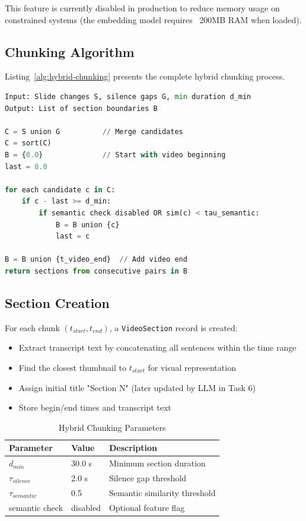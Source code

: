 \documentclass[12pt,a4paper]{article}
\begin{document}
This feature is currently disabled in production to reduce memory usage on constrained systems (the embedding model requires ~200MB RAM when loaded).

\subsection{Chunking Algorithm}

Listing~\ref{alg:hybrid-chunking} presents the complete hybrid chunking process.

\begin{lstlisting}[language=Python, caption={Hybrid Video Chunking}, label={alg:hybrid-chunking}]
Input: Slide changes S, silence gaps G, min duration d_min
Output: List of section boundaries B

C = S union G          // Merge candidates
C = sort(C)
B = {0.0}              // Start with video beginning
last = 0.0

for each candidate c in C:
    if c - last >= d_min:
        if semantic check disabled OR sim(c) < tau_semantic:
            B = B union {c}
            last = c

B = B union {t_video_end}  // Add video end
return sections from consecutive pairs in B
\end{lstlisting}

\subsection{Section Creation}

For each chunk $(t_{start}, t_{end})$, a \texttt{VideoSection} record is created:

\begin{itemize}
    \item Extract transcript text by concatenating all sentences within the time range
    \item Find the closest thumbnail to $t_{start}$ for visual representation
    \item Assign initial title "Section N" (later updated by LLM in Task 6)
    \item Store begin/end times and transcript text
\end{itemize}

\begin{table}[H]
    \centering
    \caption{Hybrid Chunking Parameters}
    \begin{tabular}{@{}lll@{}}
        \toprule
        \textbf{Parameter} & \textbf{Value} & \textbf{Description} \\ \midrule
        $d_{min}$ & 30.0 s & Minimum section duration \\
        $\tau_{silence}$ & 2.0 s & Silence gap threshold \\
        $\tau_{semantic}$ & 0.5 & Semantic similarity threshold \\
        semantic check & disabled & Optional feature flag \\ \bottomrule
    \end{tabular}
\end{table}
\end{document}
